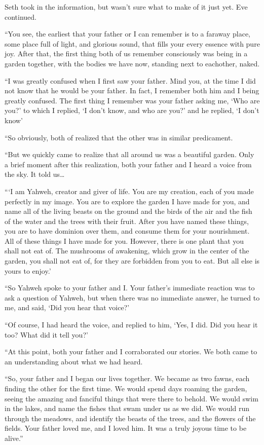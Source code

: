 \documentclass[12pt,twoside,titlepage]{report}
\begin{document}
Seth took in the information, but wasn't sure what to make of it just
yet. Eve continued.

``You see, the earliest that your father or I can remember is to a
faraway place, some place full of light, and glorious sound, that fills
your every essence with pure joy. After that, the first thing both of us
remember consciously was being in a garden together, with the bodies we
have now, standing next to eachother, naked.

``I was greatly confused when I first saw your father. Mind you, at the
time I did not know that he would be your father. In fact, I remember
both him and I being greatly confused. The first thing I remember was
your father asking me, `Who are you?' to which I replied, `I don't know,
and who are you?' and he replied, `I don't know'

``So obviously, both of realized that the other was in similar
predicament.

``But we quickly came to realize that all around us was a beautiful
garden. Only a brief moment after this realization, both your father and
I heard a voice from the sky. It told us\ldots{}

```I am Yahweh, creator and giver of life. You are my creation, each of
you made perfectly in my image. You are to explore the garden I have
made for you, and name all of the living beasts on the ground and the
birds of the air and the fish of the water and the trees with their
fruit. After you have named these things, you are to have dominion over
them, and consume them for your nourishment. All of these things I have
made for you. However, there is one plant that you shall not eat of. The
mushrooms of awakening, which grow in the center of the garden, you
shall not eat of, for they are forbidden from you to eat. But all else
is yours to enjoy.'

``So Yahweh spoke to your father and I. Your father's immediate reaction
was to ask a question of Yahweh, but when there was no immediate answer,
he turned to me, and said, `Did you hear that voice?'

``Of course, I had heard the voice, and replied to him, `Yes, I did. Did
you hear it too? What did it tell you?'

``At this point, both your father and I corraborated our stories. We
both came to an understanding about what we had heard.

``So, your father and I began our lives together. We became as two
fawns, each finding the other for the first time. We would spend days
roaming the garden, seeing the amazing and fanciful things that were
there to behold. We would swim in the lakes, and name the fishes that
swam under us as we did. We would run through the meadows, and identify
the beasts of the trees, and the flowers of the fields. Your father
loved me, and I loved him. It was a truly joyous time to be alive.''
\end{document}
